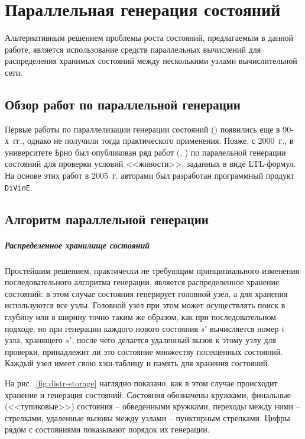 \chapter{Параллельная генерация состояний}
\label{sec:par-statespace}

Альтернативным решением проблемы роста состояний, предлагаемым в данной работе, является
использование средств параллельных вычислений для распределения хранимых состояний между
несколькими узлами вычислительной сети.

\section{Обзор работ по параллельной генерации}
\label{sec:par-analogues}

Первые работы по параллелизации генерации состояний (\cite{LS99}) появились еще в
90-х~гг., однако не получили тогда практического применения. Позже, с 2000~г., в
университете Брно был опубликован ряд работ (\cite{DLTL1}, \cite{DLTL2}) по паралельной
генерации состояний для проверки условий <<живости>>, заданных в виде LTL-формул. На
основе этих работ в 2005~г. авторами был разработан программный продукт
\texttt{DiVinE}.~\cite{DiVinE}

\section{Алгоритм параллельной генерации}
\label{sec:par-algo}

\paragraph{Распределенное хранилище состояний}
\label{sec:distr-storage}

Простейшим решением, практически не требующим принципиального изменения последовательного
алгоритма генерации, является распределенное хранение состояний: в этом случае состояния
генерирует головной узел, а для хранения используются все узлы. Головной узел при этом
может осуществлять поиск в глубину или в ширину точно таким же образом, как при
последовательном подходе, но при генерации каждого нового состояния $s'$ вычисляется номер
$i$ узла, хранящего $s'$, после чего делается удаленный вызов к этому узлу для проверки,
принадлежит ли это состояние множеству  посещенных состояний. Каждый узел
имеет свою хэш-таблицу и память для хранения состояний.

На рис.~\ref{fig:distr-storage} наглядно показано, как в этом случае происходит хранение и
генерация состояний. Состояния обозначены кружками, финальные (<<тупиковые>>) состояния --
обведенными кружками, переходы между ними -- стрелками, удаленные вызовы между узлами --
пунктирным стрелками. Цифры рядом с состояниями показывают порядок их генерации.


